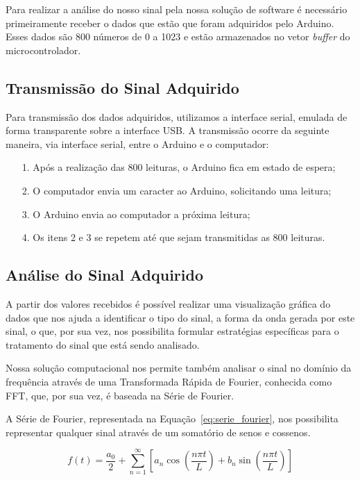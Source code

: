 \documentclass[12pt,a4paper]{report}
\begin{document}
Para realizar a análise do nosso sinal pela nossa solução de software é necessário primeiramente receber o dados que estão que foram adquiridos pelo Arduino. Esses dados são 800 números de 0 a 1023 e estão armazenados no vetor \textit{buffer} do microcontrolador.

\subsection{Transmissão do Sinal Adquirido}

Para transmissão dos dados adquiridos, utilizamos a interface serial, emulada de forma transparente sobre a interface USB. A transmissão ocorre da seguinte maneira, via interface serial, entre o Arduino e o computador:

\begin{enumerate}
\item [1.] Após a realização das 800 leituras, o Arduino fica em estado de espera;
\item [2.] O computador envia um caracter ao Arduino, solicitando uma leitura;
\item [3.] O Arduino envia ao computador a próxima leitura;
\item [4.] Os itens 2 e 3 se repetem até que sejam transmitidas as 800 leituras.
\end{enumerate}

\subsection{Análise do Sinal Adquirido}

A partir dos valores recebidos é possível realizar uma visualização gráfica do dados que nos ajuda a identificar o tipo do sinal, a forma da onda gerada por este sinal, o que, por sua vez, nos possibilita formular estratégias específicas para o tratamento do sinal que está sendo analisado.

Nossa solução computacional nos permite também analisar o sinal no domínio da frequência através de uma Transformada Rápida de Fourier, conhecida como FFT, que, por sua vez, é baseada na Série de Fourier.

A Série de Fourier, representada na Equação~\ref{eq:serie_fourier}, nos possibilita representar qualquer sinal através de um somatório de senos e cossenos.

\begin{equation}
f (t) = \frac{a_{0}}{2} + \sum_{n=1}^{\infty} [ a_{n}\cos{(\frac{n \pi t}{L})} + b_{n}\sin{(\frac{n \pi t}{L})} ]
\label{eq:serie_fourier}
\end{equation}
\end{document}
